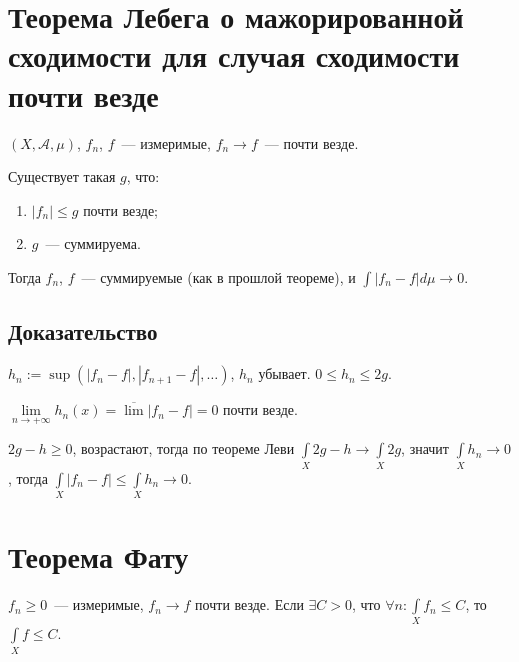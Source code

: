 \documentclass{article}
\begin{document}
    \section{Теорема Лебега о мажорированной сходимости для случая сходимости почти везде}
        
        $(X, \mathcal{A}, \mu)$, $f_n$, $f$~--- измеримые, $f_n \rightarrow f$~--- почти везде.
            
        Существует такая $g$, что:
            
            \begin{enumerate}
            
                \item $|f_n| \leqslant g$ почти везде;
                
                \item $g$~--- суммируема.
                
            \end{enumerate}
            
            Тогда $f_n$, $f$~--- суммируемые (как в прошлой теореме), и $\int |f_n - f| d \mu \rightarrow 0$.

            \subsection{Доказательство}
                
                $h_n := \sup( |f_n - f|, |f_{n + 1} - f|, \ldots )$, $h_n$ убывает. $0 \leqslant h_n \leqslant 2g$.
                
                $\lim\limits_{n \rightarrow +\infty} h_n(x) = \overline{\lim} |f_n - f| = 0$ почти везде.
                
                $2g - h \geqslant 0$, возрастают, тогда по теореме Леви $\int\limits_X 2g - h \rightarrow \int\limits_X 2g$, значит $\int\limits_X h_n \rightarrow 0$, тогда $\int\limits_X |f_n - f| \leqslant \int\limits_X h_n \rightarrow 0$.
                
    \newpage
    
    \section{Теорема Фату}
        
        $f_n \geqslant 0$~--- измеримые, $f_n \rightarrow f$ почти везде. Если $\exists C > 0$, что $\forall n : \int\limits_X f_n \leqslant C$, то $\int\limits_X f \leqslant C$.
            
\end{document}
